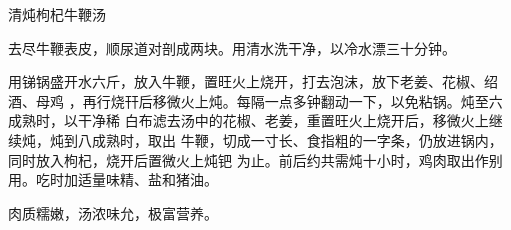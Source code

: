 \begin{recipe}{清炖枸杞牛鞭汤}

\ingredients



\preparation

去尽牛鞭表皮，顺尿道对剖成两块。用清水洗干净，以冷水漂三十分钟。

用锑锅盛开水六斤，放入牛鞭，置旺火上烧开，打去泡沫，放下老姜、花椒、绍酒、母鸡
，再行烧幵后移微火上炖。每隔一点多钟翻动一下，以免粘锅。炖至六成熟时，以干净稀
白布滤去汤中的花椒、老姜，重置旺火上烧开后，移微火上继续炖，炖到八成熟时，取出
牛鞭，切成一寸长、食指粗的一字条，仍放进锅内，同时放入枸杞，烧开后置微火上炖钯
为止。前后约共需炖十小时，鸡肉取出作别用。吃时加适量味精、盐和猪油。

\features

肉质糯嫩，汤浓味允，极富营养。

\end{recipe}

